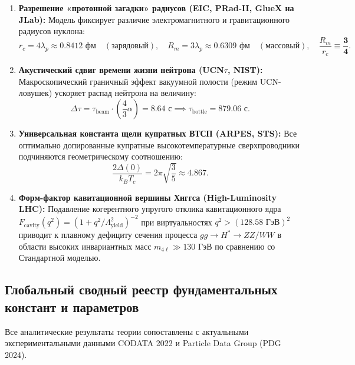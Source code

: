 \documentclass[11pt,a4paper]{article}
\theoremstyle{definition}
\theoremstyle{remark}
\begin{document}
\begin{enumerate}
    \item \textbf{Разрешение «протонной загадки» радиусов (EIC, PRad-II, GlueX на JLab):}
    Модель фиксирует различие электромагнитного и гравитационного радиусов нуклона:
    \begin{equation}
        r_c = 4\lambda_p \approx \mathbf{0.8412\text{ фм}} \quad (\text{зарядовый}), \quad R_m = 3\lambda_p \approx \mathbf{0.6309\text{ фм}} \quad (\text{массовый}), \quad \frac{R_m}{r_c} \equiv \boldsymbol{\frac{3}{4}}.
    \end{equation}

    \item \textbf{Акустический сдвиг времени жизни нейтрона (UCN$\tau$, NIST):}
    Макроскопический граничный эффект вакуумной полости (режим UCN-ловушек) ускоряет распад нейтрона на величину:
    \begin{equation}
        \Delta \tau = \tau_{\mathrm{beam}} \cdot \left(\frac{4}{3}\alpha\right) = \mathbf{8.64\text{ с}} \implies \tau_{\mathrm{bottle}} = \mathbf{879.06\text{ с}}.
    \end{equation}

    \item \textbf{Универсальная константа щели купратных ВТСП (ARPES, STS):}
    Все оптимально допированные купратные высокотемпературные сверхпроводники подчиняются геометрическому соотношению:
    \begin{equation}
        \frac{2\Delta(0)}{k_B T_c} = 2\pi \sqrt{\frac{3}{5}} \approx \mathbf{4.867}.
    \end{equation}

    \item \textbf{Форм-фактор кавитационной вершины Хиггса (High-Luminosity LHC):}
    Подавление когерентного упругого отклика кавитационного ядра $F_{\mathrm{cavity}}(q^2) = (1 + q^2/\Lambda_{\mathrm{yield}}^2)^{-2}$ при виртуальностях $q^2 > (128.58\text{ ГэВ})^2$ приводит к плавному дефициту сечения процесса $gg \to H^* \to ZZ/WW$ в области высоких инвариантных масс $m_{4\ell} \gg 130\text{ ГэВ}$ по сравнению со Стандартной моделью.
\end{enumerate}

\subsection{Глобальный сводный реестр фундаментальных констант и параметров}
Все аналитические результаты теории сопоставлены с актуальными экспериментальными данными CODATA 2022 и Particle Data Group (PDG 2024).
\end{document}
